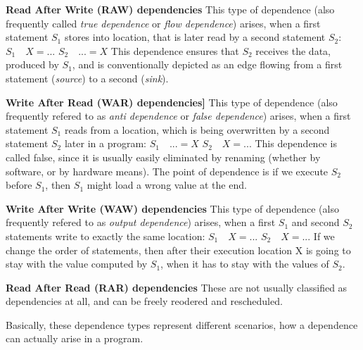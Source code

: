 \begin{description}[align=left,leftmargin=*]
\item \textbf{Read After Write (RAW) dependencies}\newline
\null\qquad This type of dependence (also frequently called \textit{true dependence} or \textit{flow dependence}) arises, when a first statement $S_{1}$ stores into location, that is later read by a second statement $S_{2}$:\newline
$S_{1}\quad X = ... $\newline
$S_{2}\quad ... = X$\newline
\null\qquad This dependence ensures that $S_{2}$ receives the data, produced by $S_{1}$, and is conventionally depicted as an edge flowing from a first statement (\textit{source}) to a second (\textit{sink}).   
  
\item \textbf{Write After Read (WAR) dependencies]}\newline
\null\qquad This type of dependence (also frequently refered to as \textit{anti dependence} or \textit{false dependence}) arises, when a first statement $S_{1}$ reads from a location, which is being overwritten by a second statement $S_{2}$ later in a program:\newline
$S_{1}\quad ... = X$\newline
$S_{2}\quad X = ... $\newline
\null\qquad This dependence is called false, since it is usually easily eliminated by renaming (whether by software, or by hardware means). The point of dependence is if we execute $S_{2}$ before $S_{1}$, then $S_{1}$ might load a wrong value at the end.
     
\item \textbf{Write After Write (WAW) dependencies}\newline
\null\qquad This type of dependence (also frequently refered to as \textit{output dependence}) arises, when a first $S_{1}$ and second $S_{2}$ statements write to exactly the same location:\newline
$S_{1}\quad X = ... $\newline
$S_{2}\quad X = ... $\newline
\null\qquad If we change the order of statements, then after their execution location X is going to stay with the value computed by $S_{1}$, when it has to stay with the values of $S_{2}$.
 
\item \textbf{Read After Read (RAR) dependencies}\newline
\null\qquad These are not usually classified as dependencies at all, and can be freely reodered and rescheduled.
\end{description}
\qquad Basically, these dependence types represent different scenarios, how a dependence can actually arise in a program.

